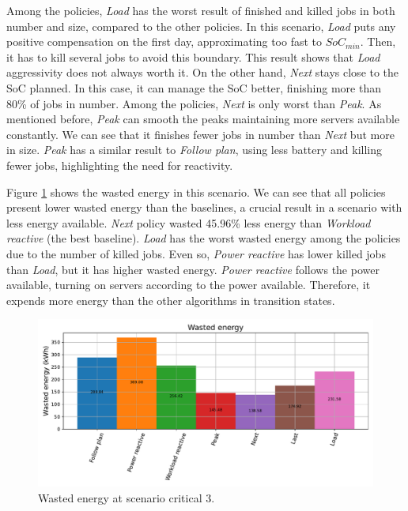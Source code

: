 Among the policies, \emph{Load} has the worst result of finished and killed jobs in both number and size, compared to the other policies. In this scenario, \emph{Load} puts any positive compensation on the first day, approximating too fast to $SoC_{min}$. Then, it has to kill several jobs to avoid this boundary. This result shows that \emph{Load} aggressivity does not always worth it. On the other hand, \emph{Next} stays close to the SoC planned. In this case, it can manage the SoC better, finishing more than 80\% of jobs in number. Among the policies, \emph{Next} is only worst than \emph{Peak}. As mentioned before, \emph{Peak} can smooth the peaks maintaining more servers available constantly. We can see that it finishes fewer jobs in number than \emph{Next} but more in size. \emph{Peak} has a similar result to \emph{Follow plan}, using less battery and killing fewer jobs, highlighting the need for reactivity.

Figure \ref{fig:energy_critical_3} shows the wasted energy in this scenario. We can see that all policies present lower wasted energy than the baselines, a crucial result in a scenario with less energy available. \emph{Next} policy wasted 45.96\% less energy than \emph{Workload reactive} (the best baseline). \emph{Load} has the worst wasted energy among the policies due to the number of killed jobs. Even so, \emph{Power reactive} has lower killed jobs than \emph{Load}, but it has higher wasted energy. \emph{Power reactive} follows the power available, turning on servers according to the power available. Therefore, it expends more energy than the other algorithms in transition states.

\begin{figure}[!htb]
    \centering
    \includegraphics[scale=0.55]{Images/Compensations/energy_critical_3.pdf}
    \caption{Wasted energy at scenario critical 3.}
    \label{fig:energy_critical_3}
\end{figure}


